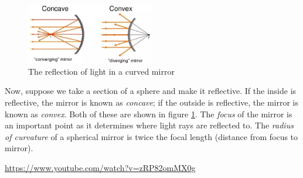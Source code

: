 \documentclass[a4paper]{amsbook}
\newcommand\capcite[1]{}
\begin{document}
\begin{figure}
  \centering
  \includegraphics[width=0.5\textwidth]{curved}
  \caption{The reflection of light in a curved mirror\\ \capcite{https://qph.ec.quoracdn.net/main-qimg-c84654e146945deec5ee6491cb547873}\label{fig:curved}}
\end{figure}

Now, suppose we take a section of a sphere and make it reflective. If the inside is reflective, the mirror is known as \textit{concave};
if the outside is reflective, the mirror is known as \textit{convex}. Both of these are shown in figure \ref{fig:curved}. The \textit{focus}
of the mirror is an important point as it determines where light rays are reflected to. The \textit{radius of curvature} of a spherical
mirror is twice the focal length (distance from focus to mirror).

\begin{center}
\begin{tcolorbox}[width=0.8\textwidth,colback={red},title={\textbf{Go and watch...}},colbacktitle=yellow,coltitle=blue]
  \textcolor{white}{\url{https://www.youtube.com/watch?v=zRP82omMX0g}}
\end{tcolorbox}
\end{center}
\end{document}
